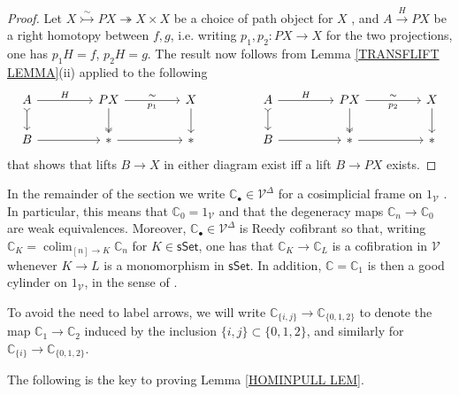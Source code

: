 \documentclass[a4paper,10pt
 ,final
]{article}%
\numberwithin{equation}{section}
\numberwithin{figure}{section}
\theoremstyle{definition} %
\DeclareMathOperator{\colim}{colim}%
\newcommand{\V}{\ensuremath{\mathcal V}}
\newcommand{\1}{\ensuremath{\mathbbm 1}}%
\begin{document}
\begin{proof}
	Let 
	$X \overset{\sim}{\rightarrowtail} PX 
	\twoheadrightarrow X \times X$
	be a choice of path object for $X$ \cite[\S 4.12]{DS95},
	and $A \xrightarrow{H} PX$
	be a right homotopy between $f,g$,
	i.e. writing $p_1,p_2 \colon PX \to X$ for the two projections,
	one has
	$p_1H=f$, $p_2H=g$.
	The result now follows from Lemma \ref{TRANSFLIFT LEMMA}(ii) %
	applied to the following
	\begin{equation}
	\begin{tikzcd}[column sep = 45pt]
	A
	\ar[rightarrowtail]{d}
	\arrow{r}{H}
	&
	PX
	\arrow[twoheadrightarrow]{d} \ar{r}{\sim}[swap]{p_1}
	&
	X \ar{d}
	&%
	A
	\ar[rightarrowtail]{d}
	\arrow{r}{H}
	&
	PX
	\arrow[twoheadrightarrow]{d} \ar{r}{\sim}[swap]{p_2}
	&
	X \ar{d}
	\\
	B
	\arrow{r}
	&
	\**\ar{r}
	&
	\**
	&%
	B
	\arrow{r}
	&
	\**\ar{r}
	&
	\**
	\end{tikzcd}
	\end{equation}
	that shows that lifts $B \to X$ in either diagram
	exist iff a lift $B \to PX$ exists.
\end{proof}



In the remainder of the section we write
$\mathbb{C}_{\bullet} \in \V^{\Delta}$
for a cosimplicial frame on $1_{\V}$
\cite[Def. 16.6.1]{Hir03}.
In particular, this means that 
$\mathbb{C}_0 = 1_{\V}$
and that the degeneracy maps
$\mathbb{C}_n \to \mathbb{C}_0$ 
are weak equivalences.
Moreover, $\mathbb{C}_{\bullet} \in \V^{\Delta}$ is Reedy cofibrant so that, writing
$\mathbb{C}_{K} = \colim_{[n] \to K} \mathbb{C}_n$
for $K \in \mathsf{sSet}$,
one has that 
$\mathbb{C}_{K} \to \mathbb{C}_{L}$
is a cofibration in $\V$
whenever $K\to L$ is a monomorphism in $\mathsf{sSet}$.
In addition, $\mathbb{C} = \mathbb{C}_1$
is then a good cylinder on $1_{\V}$, in the sense of \cite[Def. 4.2(i)]{DS95}.

To avoid the need to label arrows, 
we will write
$\mathbb{C}_{\{i,j\}} \to \mathbb{C}_{\{0,1,2\}}$
to denote the map
$\mathbb{C}_{1} \to \mathbb{C}_{2}$
induced by the inclusion $\{i,j\} \subset \{0,1,2\}$,
and similarly for $\mathbb{C}_{\{i\}} \to \mathbb{C}_{\{0,1,2\}}$.

The following is the key to proving Lemma \ref{HOMINPULL LEM}.
\end{document}
